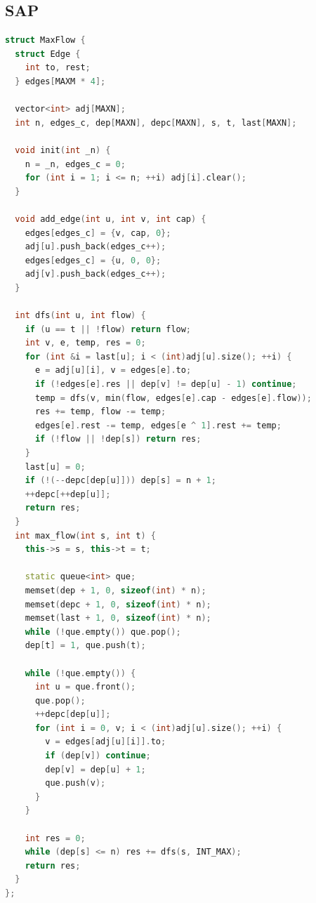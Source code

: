 \documentclass[twoside]{article}
\begin{document}
\subsection{SAP}
\begin{lstlisting}[language=c++]
struct MaxFlow {
  struct Edge {
    int to, rest;
  } edges[MAXM * 4];

  vector<int> adj[MAXN];
  int n, edges_c, dep[MAXN], depc[MAXN], s, t, last[MAXN];

  void init(int _n) {
    n = _n, edges_c = 0;
    for (int i = 1; i <= n; ++i) adj[i].clear();
  }

  void add_edge(int u, int v, int cap) {
    edges[edges_c] = {v, cap, 0};
    adj[u].push_back(edges_c++);
    edges[edges_c] = {u, 0, 0};
    adj[v].push_back(edges_c++);
  }

  int dfs(int u, int flow) {
    if (u == t || !flow) return flow;
    int v, e, temp, res = 0;
    for (int &i = last[u]; i < (int)adj[u].size(); ++i) {
      e = adj[u][i], v = edges[e].to;
      if (!edges[e].res || dep[v] != dep[u] - 1) continue;
      temp = dfs(v, min(flow, edges[e].cap - edges[e].flow));
      res += temp, flow -= temp;
      edges[e].rest -= temp, edges[e ^ 1].rest += temp;
      if (!flow || !dep[s]) return res;
    }
    last[u] = 0;
    if (!(--depc[dep[u]])) dep[s] = n + 1;
    ++depc[++dep[u]];
    return res;
  }
  int max_flow(int s, int t) {
    this->s = s, this->t = t;

    static queue<int> que;
    memset(dep + 1, 0, sizeof(int) * n);
    memset(depc + 1, 0, sizeof(int) * n);
    memset(last + 1, 0, sizeof(int) * n);
    while (!que.empty()) que.pop();
    dep[t] = 1, que.push(t);

    while (!que.empty()) {
      int u = que.front();
      que.pop();
      ++depc[dep[u]];
      for (int i = 0, v; i < (int)adj[u].size(); ++i) {
        v = edges[adj[u][i]].to;
        if (dep[v]) continue;
        dep[v] = dep[u] + 1;
        que.push(v);
      }
    }

    int res = 0;
    while (dep[s] <= n) res += dfs(s, INT_MAX);
    return res;
  }
};

\end{lstlisting}
\end{document}
